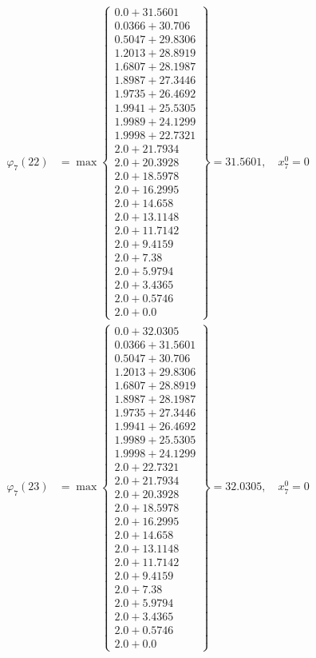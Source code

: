 \documentclass{article}
\begin{document}
\begin{align*}
\varphi_{7}(22) &= \max \left\{ \begin{array}{c}
0.0 + 31.5601 \\
 0.0366 + 30.706 \\
 0.5047 + 29.8306 \\
 1.2013 + 28.8919 \\
 1.6807 + 28.1987 \\
 1.8987 + 27.3446 \\
 1.9735 + 26.4692 \\
 1.9941 + 25.5305 \\
 1.9989 + 24.1299 \\
 1.9998 + 22.7321 \\
 2.0 + 21.7934 \\
 2.0 + 20.3928 \\
 2.0 + 18.5978 \\
 2.0 + 16.2995 \\
 2.0 + 14.658 \\
 2.0 + 13.1148 \\
 2.0 + 11.7142 \\
 2.0 + 9.4159 \\
 2.0 + 7.38 \\
 2.0 + 5.9794 \\
 2.0 + 3.4365 \\
 2.0 + 0.5746 \\
 2.0 + 0.0
\end{array} \right\}=31.5601, \quad x_{7}^0=0\\
  
\varphi_{7}(23) &= \max \left\{ \begin{array}{c}
0.0 + 32.0305 \\
 0.0366 + 31.5601 \\
 0.5047 + 30.706 \\
 1.2013 + 29.8306 \\
 1.6807 + 28.8919 \\
 1.8987 + 28.1987 \\
 1.9735 + 27.3446 \\
 1.9941 + 26.4692 \\
 1.9989 + 25.5305 \\
 1.9998 + 24.1299 \\
 2.0 + 22.7321 \\
 2.0 + 21.7934 \\
 2.0 + 20.3928 \\
 2.0 + 18.5978 \\
 2.0 + 16.2995 \\
 2.0 + 14.658 \\
 2.0 + 13.1148 \\
 2.0 + 11.7142 \\
 2.0 + 9.4159 \\
 2.0 + 7.38 \\
 2.0 + 5.9794 \\
 2.0 + 3.4365 \\
 2.0 + 0.5746 \\
 2.0 + 0.0
\end{array} \right\}=32.0305, \quad x_{7}^0=0\\
  

\end{align*}
\end{document}
